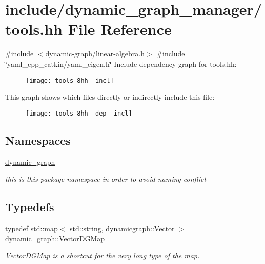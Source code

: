 \hypertarget{tools_8hh}{}\section{include/dynamic\+\_\+graph\+\_\+manager/tools.hh File Reference}
\label{tools_8hh}
{\ttfamily \#include $<$dynamic-\/graph/linear-\/algebra.\+h$>$}\newline
{\ttfamily \#include \char`\"{}yaml\+\_\+cpp\+\_\+catkin/yaml\+\_\+eigen.\+h\char`\"{}}\newline
Include dependency graph for tools.\+hh\+:
\nopagebreak
\begin{figure}[H]
\begin{center}
\leavevmode
\texttt{[image: tools\_8hh\_\_incl]}
\end{center}
\end{figure}
This graph shows which files directly or indirectly include this file\+:
\nopagebreak
\begin{figure}[H]
\begin{center}
\leavevmode
\texttt{[image: tools\_8hh\_\_dep\_\_incl]}
\end{center}
\end{figure}
\subsection*{Namespaces}
\begin{DoxyCompactItemize}
\item 
 \hyperlink{namespacedynamic__graph}{dynamic\+\_\+graph}
\begin{DoxyCompactList}\small\item\em this is this package namespace in order to avoid naming conflict \end{DoxyCompactList}\end{DoxyCompactItemize}
\subsection*{Typedefs}
\begin{DoxyCompactItemize}
\item 
\mbox{\label{namespacedynamic__graph_abd184187f3bc15df5e227d866529e4a7}} 
typedef std\+::map$<$ std\+::string, dynamicgraph\+::\+Vector $>$ \hyperlink{namespacedynamic__graph_abd184187f3bc15df5e227d866529e4a7}{dynamic\+\_\+graph\+::\+Vector\+D\+G\+Map}
\begin{DoxyCompactList}\small\item\em Vector\+D\+G\+Map is a shortcut for the very long type of the map. \end{DoxyCompactList}\end{DoxyCompactItemize}
